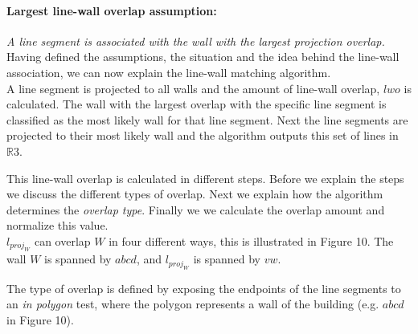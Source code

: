 	\paragraph{Largest line-wall overlap assumption:}
	\emph{A line segment is associated with the wall with the largest projection
	overlap.}\\

	Having defined the assumptions, the situation and the idea behind the
	line-wall association, we can now explain the line-wall matching algorithm.\\ 

	A line segment is projected to all walls and the amount of line-wall
	overlap, $lwo$ is calculated. The wall with the largest overlap with the specific line
segment is classified as the most likely wall for that line segment.
	Next the line segments are projected to their most likely wall and the
	algorithm outputs this set of lines in $\mathbb{R}3$. 
	

	This line-wall overlap is calculated in different steps.
	Before we explain the steps we discuss the different types of overlap. Next
	we explain how the algorithm determines the \emph{overlap type}. Finally we
	we calculate the overlap amount and normalize this value.\\

	$l_{proj_W}$ can overlap $W$ in four different ways, this is illustrated 
	in Figure 10. The wall $W$ is spanned by $abcd$, and $l_{proj_W}$ is spanned
	by $vw$.
	
		
	\clearpage


	The type of overlap is defined by exposing the endpoints of the line
	segments to an \emph{in polygon} test, where the polygon represents a 
	wall of the building (e.g. $abcd$ in Figure 10).

